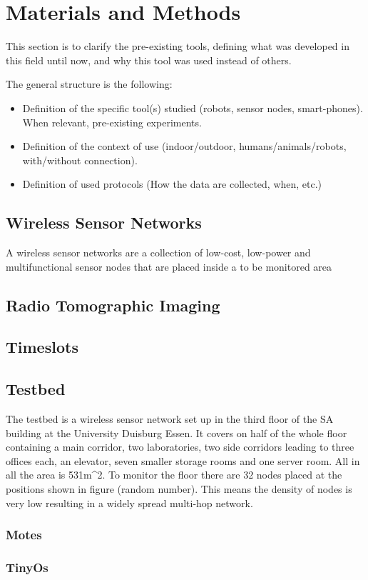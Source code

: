 \chapter{Materials and Methods}

This section is to clarify the pre-existing tools, defining what was developed in this field until now, and why this tool was used instead of others.

The general structure is the following:
\begin{itemize}
	\item Definition of the specific tool(s) studied (robots, sensor nodes, smart-phones). When relevant, pre-existing experiments.
	\item Definition of the context of use (indoor/outdoor, humans/animals/robots, with/without connection).
	\item Definition of used protocols (How the data are collected, when, etc.)
\end{itemize}

\section{Wireless Sensor Networks}
	A wireless sensor networks are a collection of low-cost, low-power and multifunctional sensor nodes that are placed inside a to be monitored area   
\section{Radio Tomographic Imaging}
\section{Timeslots}
\section{Testbed}
The testbed is a wireless sensor network set up in the third floor of the SA building at the University Duisburg Essen. It covers on half of the whole floor containing a main corridor, two laboratories, two side corridors leading to three offices each, an elevator, seven smaller storage rooms and one server room. All in all the area is 531m^2.\n
To monitor the floor there are 32 nodes placed at the positions shown in figure (random number). This means the density of nodes is very low resulting in a widely spread multi-hop network. 
\subsection{Motes}
\subsection{TinyOs}




